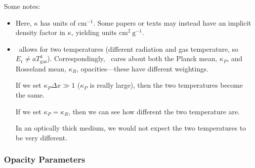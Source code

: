 Some notes:
\begin{itemize}
\item Here, $\kappa$ has units of $\mathrm{cm}^{-1}$.  Some papers or
  texts may instead have an implicit density factor in $\kappa$,
  yielding units $\mathrm{cm}^2~\mathrm{g}^{-1}$.

\item \castro\ allows for two temperatures (different radiation and gas
  temperature, so $E_\mathrm{r} \ne a T_\mathrm{gas}^4$).
  Correspondingly,  \castro\ cares about both the Planck mean,
  $\kappa_P$, and Rosseland mean, $\kappa_R$, opacities---these have
  different weightings.

  If we set $\kappa_P \Delta x \gg 1$ ($\kappa_P$ is really large),
  then the two temperatures become the same.

  If we set $\kappa_P = \kappa_R$, then we can see how different the
  two temperature are.

  In an optically thick medium, we would not expect the two temperatures
  to be very different.

\end{itemize}


\subsubsection{Opacity Parameters}
\label{sec:opacpars}

